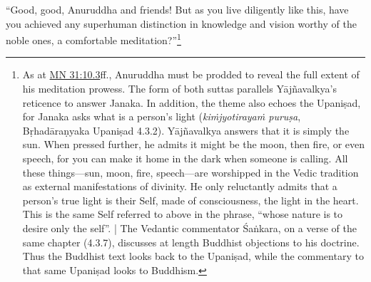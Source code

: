 \documentclass[12pt,openany]{book}%
\begin{document}
“Good, good, Anuruddha and friends! But as you live diligently like this, have you achieved any superhuman distinction in knowledge and vision worthy of the noble ones, a comfortable meditation?”\footnote{As at \href{https://suttacentral.net/mn31/en/sujato\#10.3}{MN 31:10.3}ff., Anuruddha must be prodded to reveal the full extent of his meditation prowess. The form of both suttas parallels \textsanskrit{Yājñavalkya}’s reticence to answer Janaka. In addition, the theme also echoes the \textsanskrit{Upaniṣad}, for Janaka asks what is a person’s light (\textit{\textsanskrit{kiṁjyotirayaṁ} \textsanskrit{puruṣa}}, \textsanskrit{Bṛhadāraṇyaka} \textsanskrit{Upaniṣad} 4.3.2). \textsanskrit{Yājñavalkya} answers that it is simply the sun. When pressed further, he admits it might be the moon, then fire, or even speech, for you can make it home in the dark when someone is calling. All these things—sun, moon, fire, speech—are worshipped in the Vedic tradition as external manifestations of divinity. He only reluctantly admits that a person’s true light is their Self, made of consciousness, the light in the heart. This is the same Self referred to above in the phrase, “whose nature is to desire only the self”. | The Vedantic commentator \textsanskrit{Śaṅkara}, on a verse of the same chapter (4.3.7), discusses at length Buddhist objections to his doctrine. Thus the Buddhist text looks back to the \textsanskrit{Upaniṣad}, while the commentary to that same \textsanskrit{Upaniṣad} looks to Buddhism. } 
\end{document}
